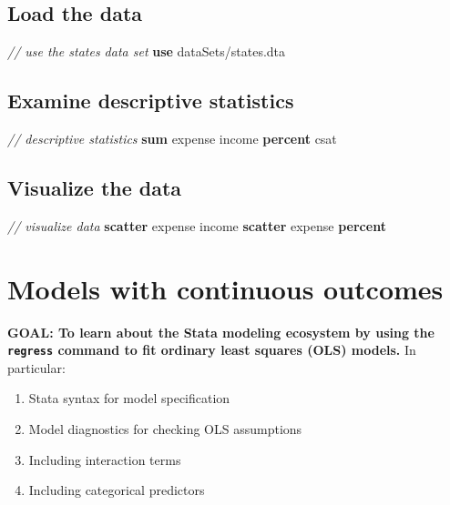 \documentclass[
]{book}
\newenvironment{Shaded}{\begin{snugshade}}{\end{snugshade}}
\newcommand{\CommentTok}[1]{\textcolor[rgb]{0.56,0.35,0.01}{\textit{#1}}}
\newcommand{\KeywordTok}[1]{\textcolor[rgb]{0.13,0.29,0.53}{\textbf{#1}}}
\newcommand{\NormalTok}[1]{#1}
\providecommand{\tightlist}{%
  \setlength{\itemsep}{0pt}\setlength{\parskip}{0pt}}
\begin{document}
\hypertarget{load-the-data-1}{%
\subsection{Load the data}\label{load-the-data-1}}

\begin{Shaded}
\begin{Highlighting}[]
\CommentTok{// use the states data set}
\KeywordTok{use}\NormalTok{ dataSets/states.dta}
\end{Highlighting}
\end{Shaded}

\hypertarget{examine-descriptive-statistics}{%
\subsection{Examine descriptive statistics}\label{examine-descriptive-statistics}}

\begin{Shaded}
\begin{Highlighting}[]
\CommentTok{// descriptive statistics }
\KeywordTok{sum}\NormalTok{ expense income }\KeywordTok{percent}\NormalTok{ csat}
\end{Highlighting}
\end{Shaded}

\hypertarget{visualize-the-data}{%
\subsection{Visualize the data}\label{visualize-the-data}}

\begin{Shaded}
\begin{Highlighting}[]
\CommentTok{// visualize data }
\KeywordTok{scatter}\NormalTok{ expense income}
\KeywordTok{scatter}\NormalTok{ expense }\KeywordTok{percent} 
\end{Highlighting}
\end{Shaded}

\hypertarget{models-with-continuous-outcomes-1}{%
\section{Models with continuous outcomes}\label{models-with-continuous-outcomes-1}}

\begin{alert}

\textbf{GOAL: To learn about the Stata modeling ecosystem by using the \texttt{regress} command to fit ordinary least squares (OLS) models.} In particular:

\begin{enumerate}
\def\labelenumi{\arabic{enumi}.}
\tightlist
\item
  Stata syntax for model specification
\item
  Model diagnostics for checking OLS assumptions
\item
  Including interaction terms
\item
  Including categorical predictors
\end{enumerate}

\end{alert}
\end{document}
